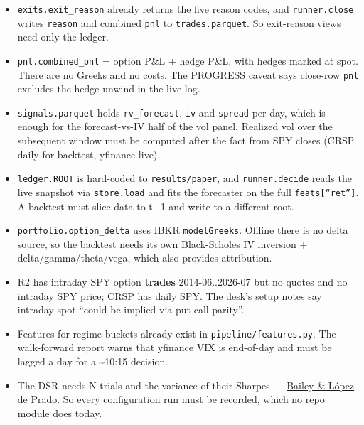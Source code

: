 \documentclass{article}
\begin{document}
\begin{itemize}

\item [REPO] \texttt{exits.\allowbreak{}exit\_\allowbreak{}reason} already returns the five reason codes, and \texttt{runner.\allowbreak{}close} writes \texttt{reason} and combined \texttt{pnl} to \texttt{trades.\allowbreak{}parquet}. So exit-reason views need only the ledger.

\item [REPO] \texttt{pnl.\allowbreak{}combined\_\allowbreak{}pnl} = option P\&L + hedge P\&L, with hedges marked at spot. There are no Greeks and no costs. The PROGRESS caveat says close-row \texttt{pnl} excludes the hedge unwind in the live log.

\item [REPO] \texttt{signals.\allowbreak{}parquet} holds \texttt{rv\_\allowbreak{}forecast}, \texttt{iv} and \texttt{spread} per day, which is enough for the forecast-vs-IV half of the vol panel. Realized vol over the subsequent window must be computed after the fact from SPY closes (CRSP daily for backtest, yfinance live).

\item [REPO] \texttt{ledger.\allowbreak{}ROOT} is hard-coded to \texttt{results/\allowbreak{}paper}, and \texttt{runner.\allowbreak{}decide} reads the live snapshot via \texttt{store.\allowbreak{}load} and fits the forecaster on the full \texttt{feats[``ret'']}. A backtest must slice data to t\ensuremath{-}1 and write to a different root.

\item [REPO] \texttt{portfolio.\allowbreak{}option\_\allowbreak{}delta} uses IBKR \texttt{modelGreeks}. Offline there is no delta source, so the backtest needs its own Black-Scholes IV inversion + delta/\allowbreak{}gamma/\allowbreak{}theta/\allowbreak{}vega, which also provides attribution.

\item [TEAM] R2 has intraday SPY option \textbf{trades} 2014-06..2026-07 but no quotes and no intraday SPY price; CRSP has daily SPY. The desk's setup notes say intraday spot ``could be implied via put-call parity''.

\item [REPO] Features for regime buckets already exist in \texttt{pipeline/\allowbreak{}features.\allowbreak{}py}. The walk-forward report warns that yfinance VIX is end-of-day and must be lagged a day for a \textasciitilde{}10:15 decision.

\item The DSR needs N trials and the variance of their Sharpes --- \href{https://www.davidhbailey.com/dhbpapers/deflated-sharpe.pdf}{Bailey \& López de Prado}. So every configuration run must be recorded, which no repo module does today.

\end{itemize}
\end{document}

